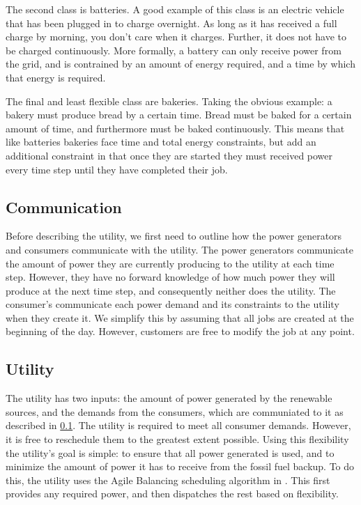 \documentclass[conference]{IEEEtran}
\begin{document}
The second class is batteries.  A good example of this class is an electric vehicle that has been plugged in to charge overnight.  As long as it has received a full charge by morning, you don't care when it charges.  Further, it does not have to be charged continuously.  More formally, a battery can only receive power from the grid, and is contrained by an amount of energy required, and a time by which that energy is required.

The final and least flexible class are bakeries.  Taking the obvious example: a bakery must produce bread by a certain time.  Bread must be baked for a certain amount of time, and furthermore must be baked continuously.  This means that like batteries bakeries face time and total energy constraints, but add an additional constraint in that once they are started they must received power every time step until they have completed their job.

\subsection{Communication}
\label{Communication}

Before describing the utility, we first need to outline how the power generators and consumers communicate with the utility.  The power generators communicate the amount of power they are currently producing to the utility at each time step.  However, they have no forward knowledge of how much power they will produce at the next time step, and consequently neither does the utility.  The consumer's communicate each power demand and its constraints to the utility when they create it.  We simplify this by assuming that all jobs are created at the beginning of the day.  However, customers are free to modify the job at any point.

\subsection{Utility}
\label{Utility}

The utility has two inputs: the amount of power generated by the renewable sources, and the demands from the consumers, which are communiated to it as described in \ref{Communication}.  The utility is required to meet all consumer demands.  However, it is free to reschedule them to the greatest extent possible.  Using this flexibility the utility's goal is simple: to ensure that all power generated is used, and to minimize the amount of power it has to receive from the fossil fuel backup. To do this, the utility uses the Agile Balancing scheduling algorithm in \cite{petersen2013taxonomy}.  This first provides any required power, and then dispatches the rest based on flexibility.
\end{document}
